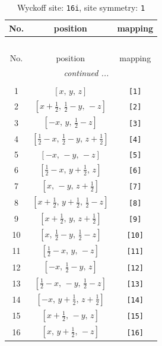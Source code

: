 \documentclass[fleqn,8pt]{jsarticle}
\begin{document}
\begin{longtable}{ccc}
\caption{Wyckoff site: {\tt 16i}, site symmetry: {\tt 1}}
 \\
 \hline \hline
No. & position & mapping \\ \hline \endfirsthead

\multicolumn{2}{l}{\tablename\ \thetable{}} \\
 \hline \hline
No. & position & mapping \\ \hline \endhead

 \hline \hline
\multicolumn{2}{r}{\footnotesize\it continued ...} \\ \endfoot

 \hline \hline
\multicolumn{2}{r}{} \\ \endlastfoot

1 & $\left[ x,\, y,\, z \right]$ & {\tt [1]} \\ \hline
2 & $\left[ x + \frac{1}{2},\, \frac{1}{2} - y,\, - z \right]$ & {\tt [2]} \\ \hline
3 & $\left[ - x,\, y,\, \frac{1}{2} - z \right]$ & {\tt [3]} \\ \hline
4 & $\left[ \frac{1}{2} - x,\, \frac{1}{2} - y,\, z + \frac{1}{2} \right]$ & {\tt [4]} \\ \hline
5 & $\left[ - x,\, - y,\, - z \right]$ & {\tt [5]} \\ \hline
6 & $\left[ \frac{1}{2} - x,\, y + \frac{1}{2},\, z \right]$ & {\tt [6]} \\ \hline
7 & $\left[ x,\, - y,\, z + \frac{1}{2} \right]$ & {\tt [7]} \\ \hline
8 & $\left[ x + \frac{1}{2},\, y + \frac{1}{2},\, \frac{1}{2} - z \right]$ & {\tt [8]} \\ \hline
9 & $\left[ x + \frac{1}{2},\, y,\, z + \frac{1}{2} \right]$ & {\tt [9]} \\ \hline
10 & $\left[ x,\, \frac{1}{2} - y,\, \frac{1}{2} - z \right]$ & {\tt [10]} \\ \hline
11 & $\left[ \frac{1}{2} - x,\, y,\, - z \right]$ & {\tt [11]} \\ \hline
12 & $\left[ - x,\, \frac{1}{2} - y,\, z \right]$ & {\tt [12]} \\ \hline
13 & $\left[ \frac{1}{2} - x,\, - y,\, \frac{1}{2} - z \right]$ & {\tt [13]} \\ \hline
14 & $\left[ - x,\, y + \frac{1}{2},\, z + \frac{1}{2} \right]$ & {\tt [14]} \\ \hline
15 & $\left[ x + \frac{1}{2},\, - y,\, z \right]$ & {\tt [15]} \\ \hline
16 & $\left[ x,\, y + \frac{1}{2},\, - z \right]$ & {\tt [16]} \\
\end{longtable}
\end{document}
